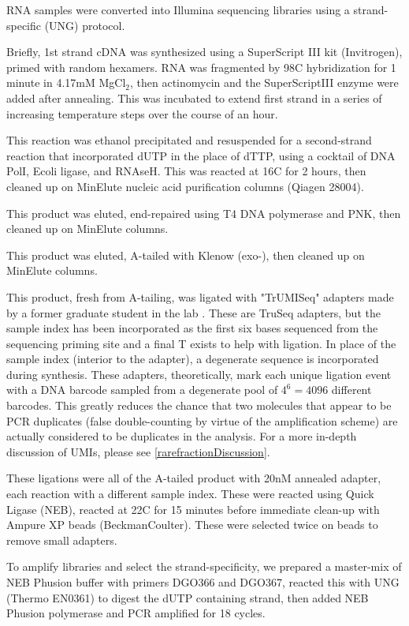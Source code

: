 RNA samples were converted into Illumina sequencing libraries using a
strand-specific (UNG) protocol.

Briefly, 1st strand cDNA was synthesized using a SuperScript III kit
(Invitrogen), primed with random hexamers. RNA was fragmented by
98C hybridization for 1 minute in 4.17mM MgCl$_2$, then actinomycin
and the SuperScriptIII enzyme were added after annealing.  
This was incubated to extend first strand in a series of increasing
temperature steps over the course of an hour.

This reaction was ethanol precipitated
and resuspended for a second-strand reaction that incorporated dUTP
in the place of dTTP, using a cocktail of DNA PolI, Ecoli ligase, and
RNAseH. This was reacted at 16C for 2 hours, then cleaned up on
MinElute nucleic acid purification columns (Qiagen 28004).

This product was eluted, end-repaired using T4 DNA polymerase and PNK,
then cleaned up on MinElute columns.

This product was eluted, A-tailed with Klenow (exo-), 
then cleaned up on MinElute columns.

This product, fresh from A-tailing, was ligated with "TrUMISeq"
adapters made by a former graduate student in the lab
\parencite{hong2017method}. These are TruSeq adapters, but the
sample index has been incorporated as the first six bases sequenced
from the sequencing priming site and a final T exists to help with
ligation. In place of the sample index (interior to the adapter),
a degenerate sequence is incorporated during synthesis.
These adapters, theoretically, mark each unique ligation event
with a DNA barcode sampled from a degenerate pool of $4^6 = 4096$
different barcodes. This greatly reduces the chance that two
molecules that appear to be PCR duplicates (false double-counting
by virtue of the amplification scheme) are actually considered
to be duplicates in the analysis. For a more in-depth discussion of
UMIs, please see
\autoref{rarefractionDiscussion}.

These ligations were all of the A-tailed product with 20nM annealed
adapter, each reaction with a different sample index. These were
reacted using Quick Ligase (NEB), reacted at 22C for 15 minutes
before immediate clean-up with Ampure XP beads (BeckmanCoulter).
These were selected twice on beads to remove small adapters.

To amplify libraries and select the strand-specificity, we prepared a
master-mix of NEB Phusion buffer with primers DGO366 and DGO367,
reacted this with UNG (Thermo EN0361) to digest the dUTP containing
strand, then added NEB Phusion polymerase and PCR amplified for
18 cycles.

